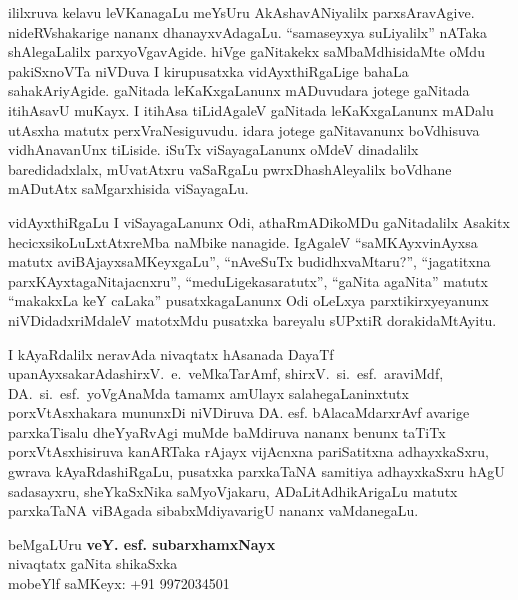 ililxruva kelavu leVKanagaLu meYsUru AkAshavANiyalilx parxsAravAgive. nideRV\-shakarige nananx dhanayxvAdagaLu. ``samaseyxya suLiyalilx'' nATaka shAlegaLalilx parxyoVga\-vAgide. hiVge gaNitakekx saMbaMdhisidaMte oMdu 
pakiSxnoVTa niVDuva I kirupusatxka vidAyxthiR\-gaLige bahaLa sahakAriyAgide. gaNitada leKaKxgaLanunx mADuvudara jotege gaNitada itihAsavU muKayx. I itihAsa tiLidAgaleV gaNitada leKaKxgaLanunx mADalu utAsxha matutx perxVraNesiguvudu. idara jotege gaNitavanunx boVdhisuva vidhAnavanUnx tiLiside. iSuTx viSayagaLanunx oMdeV dinadalilx baredidadxlalx, mUvatAtxru vaSaRgaLu pwrxDhashAle\-yalilx boVdhane mADutAtx saMgarxhisida viSayagaLu.

vidAyxthiRgaLu I viSayagaLanunx Odi, athaRmADikoMDu gaNitadalilx Asakitx\- hecicxsikoLuLxtAtxreMba naMbike nanagide. IgAgaleV ``saMKAyxvinAyxsa matutx aviBAjayx\break saMKeyxgaLu'',  ``nAveSuTx budidhxvaMtaru?'', ``jagatitxna parxKAyxtagaNitajacnxru'', ``meduLige\break kasaratutx'', ``gaNita agaNita'' matutx ``makakxLa keY caLaka'' pusatxkagaLanunx Odi oLeLxya parxtikirxye\-yanunx niVDi\-dadxriMdaleV matotxMdu pusatxka bareyalu sUPxtiR dorakidaMtAyitu.

I kAyaRdalilx neravAda nivaqtatx hAsanada DayaTf upanAyxsakarAda\break shirxV.~e.~veMkaTarAmf, shirxV.~si.~esf.~araviMdf, 
DA.~si.~esf.~yoVgAnaMda tamamx amUlayx salahegaLaninxtutx porxVtAsxhakara mununxDi niVDiruva DA. esf. bAlacaMdarxrAvf avarige parxkaTisalu dheYyaRvAgi muMde baMdiruva nananx benunx taTiTx porxVtAsxhisiruva kanARTaka rAjayx vijAcnxna pariSatitxna adhayxkaSxru, gwrava kAyaRdashiRgaLu, pusatxka parxkaTaNA samitiya adhayxkaSxru hAgU sadasayxru, sheYkaSxNika saMyoVjakaru, ADaLitAdhikArigaLu matutx parxkaTaNA viBAgada sibabxMdiyavarigU nananx vaMdanegaLu. 

\begin{flushright}
beMgaLUru \hfill{\bf veY. esf. subarxhamxNayx}\hfill\\
nivaqtatx gaNita shikaSxka\\
mobeYlf saMKeyx: {\rm +91 9972034501}
\end{flushright}






\newpage

